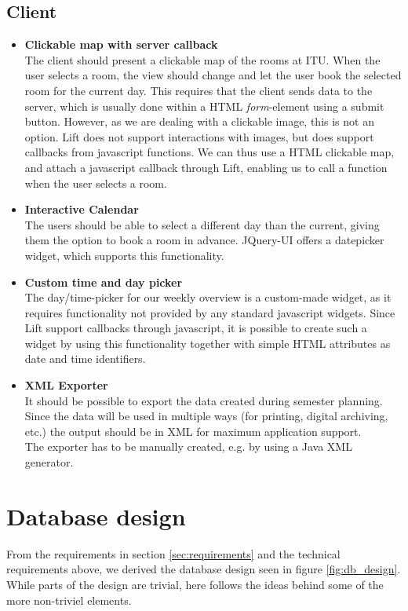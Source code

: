 \subsection{Client}
\label{sub:req_client}
\begin{itemize}
	\item \textbf{Clickable map with server callback}\\
	The client should present a clickable map of the rooms at ITU. When the user selects a room, the view should change and let the user book the selected room for the current day. This requires that the client sends data to the server, which is usually done within a HTML \emph{form}-element using a submit button. However, as we are dealing with a clickable image, this is not an option. Lift does not support interactions with images, but does support callbacks from javascript functions. We can thus use a HTML clickable map\cite{html_map}, and attach a javascript callback through Lift, enabling us to call a function when the user selects a room.
	\item \textbf{Interactive Calendar}\\
	The users should be able to select a different day than the current, giving them the option to book a room in advance. JQuery-UI\cite{jqueryui} offers a datepicker widget\cite{jqueryui_date}, which supports this functionality.
	\item \textbf{Custom time and day picker}\\
	The day/time-picker for our weekly overview is a custom-made widget, as it requires functionality not provided by any standard javascript widgets. Since Lift support callbacks through javascript, it is possible to create such a widget by using this functionality together with simple HTML attributes as date and time identifiers.
	\item \textbf{XML Exporter}\\
	It should be possible to export the data created during semester planning. Since the data will be used in multiple ways (for printing, digital archiving, etc.) the output should be in XML for maximum application support.\\ 
The exporter has to be manually created, e.g. by using a Java XML generator.
\end{itemize}

\section{Database design}
\label{sec:database_design}
From the requirements in section \ref{sec:requirements} and the technical requirements above, we derived the database design seen in figure \ref{fig:db_design}. While parts of the design are trivial, here follows the ideas behind some of the more non-triviel elements.

